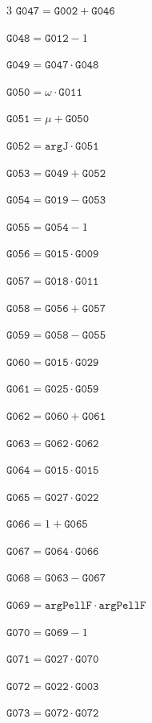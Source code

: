 \documentclass[10pt]{article}
\begin{document}
\begin{multicols}{3}
\noindent $\mathtt{G047}=\mathtt{G002}+\mathtt{G046}$\par
\noindent $\mathtt{G048}=\mathtt{G012}-1$\par
\noindent $\mathtt{G049}=\mathtt{G047}\cdot \mathtt{G048}$\par
\noindent $\mathtt{G050}=\omega\cdot \mathtt{G011}$\par
\noindent $\mathtt{G051}=\mu+\mathtt{G050}$\par
\noindent $\mathtt{G052}=\mathtt{argJ}\cdot \mathtt{G051}$\par
\noindent $\mathtt{G053}=\mathtt{G049}+\mathtt{G052}$\par
\noindent $\mathtt{G054}=\mathtt{G019}-\mathtt{G053}$\par
\noindent $\mathtt{G055}=\mathtt{G054}-1$\par
\noindent $\mathtt{G056}=\mathtt{G015}\cdot \mathtt{G009}$\par
\noindent $\mathtt{G057}=\mathtt{G018}\cdot \mathtt{G011}$\par
\noindent $\mathtt{G058}=\mathtt{G056}+\mathtt{G057}$\par
\noindent $\mathtt{G059}=\mathtt{G058}-\mathtt{G055}$\par
\noindent $\mathtt{G060}=\mathtt{G015}\cdot \mathtt{G029}$\par
\noindent $\mathtt{G061}=\mathtt{G025}\cdot \mathtt{G059}$\par
\noindent $\mathtt{G062}=\mathtt{G060}+\mathtt{G061}$\par
\noindent $\mathtt{G063}=\mathtt{G062}\cdot \mathtt{G062}$\par
\noindent $\mathtt{G064}=\mathtt{G015}\cdot \mathtt{G015}$\par
\noindent $\mathtt{G065}=\mathtt{G027}\cdot \mathtt{G022}$\par
\noindent $\mathtt{G066}=1+\mathtt{G065}$\par
\noindent $\mathtt{G067}=\mathtt{G064}\cdot \mathtt{G066}$\par
\noindent $\mathtt{G068}=\mathtt{G063}-\mathtt{G067}$\par
\noindent $\mathtt{G069}=\mathtt{argPellF}\cdot \mathtt{argPellF}$\par
\noindent $\mathtt{G070}=\mathtt{G069}-1$\par
\noindent $\mathtt{G071}=\mathtt{G027}\cdot \mathtt{G070}$\par
\noindent $\mathtt{G072}=\mathtt{G022}\cdot \mathtt{G003}$\par
\noindent $\mathtt{G073}=\mathtt{G072}\cdot \mathtt{G072}$\par

\end{multicols}
\end{document}
